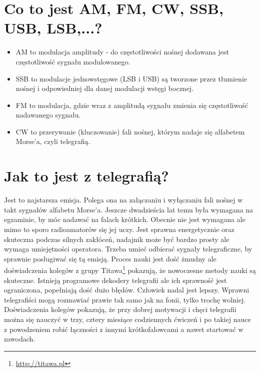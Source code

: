 \documentclass[a4paper,12pt]{article}
\begin{document}
\section{Co to jest AM, FM, CW, SSB, USB, LSB,...?}
\begin{itemize}
\item AM to modulacja amplitudy - do częstotliwości nośnej dodawana jest częstotliwość sygnału modulowanego. 
\item SSB to modulacje jednowstęgowe (LSB i USB) są tworzone przez tłumienie nośnej i odpowiedniej dla danej modulacji wstęgi bocznej. 
\item FM to modulacja, gdzie wraz z amplitudą sygnału zmienia się częstotliwość nadawanego sygnału. 
\item CW to przerywanie (kluczowanie) fali nośnej, którym nadaje się alfabetem Morse'a, czyli telegrafią. \end{itemize}

\section{Jak to jest z telegrafią?}
Jest to najstarsza emisja. Polega ona na załączaniu i wyłączaniu fali nośnej w takt sygnałów alfabetu Morse'a. Jeszcze dwadzieścia lat temu była wymagana na egzaminie, by móc nadawać na falach krótkich. Obecnie nie jest wymagana ale mimo to sporo radioamatorów się jej uczy. Jest sprawna energetycznie oraz skuteczna podczas silnych zakłóceń, nadajnik może być bardzo prosty ale wymaga umiejętności operatora. Trzeba umieć odbierać sygnały telegraficzne, by sprawnie posługiwać się tą emisją. Proces nauki jest dość żmudny ale doświadczenia kolegów z grupy Titawa\footnote{\url{http://titawa.pl}} pokazują, że nowoczesne metody nauki są skuteczne. Istnieją programowe dekodery telegrafii ale ich sprawność jest ograniczona, popełniają dość dużo błędów. Człowiek nadal jest lepszy. Wprawni telegrafiści mogą rozmawiać prawie tak samo jak na fonii, tylko trochę wolniej. Doświadczenia kolegów pokazują, że przy dobrej motywacji i chęci telegrafii można się nauczyć w trzy, cztery miesiące codziennych ćwiczeń i po takiej nauce z powodzeniem robić łączności z innymi krótkofalowcami a nawet startować w zawodach.
\end{document}
